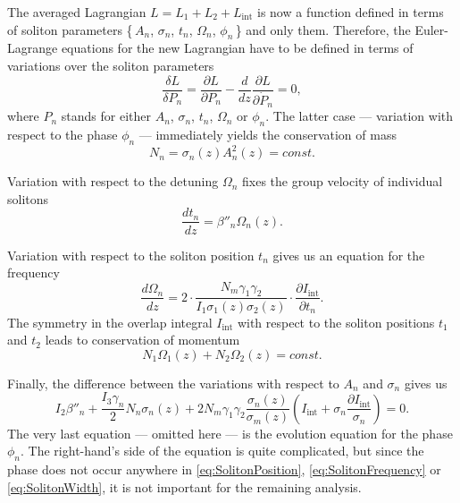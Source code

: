 \documentclass[a4paper,11pt]{article}
\begin{document}
The averaged Lagrangian $L = L_{1} + L_{2} + L_{\text{int}}$ is now a function defined in terms of soliton parameters \{\,$A_{n}$, $\sigma_{n}$, $t_{n}$, $\Omega_{n}$, $\phi_{n}$\,\} and only them. Therefore, the Euler-Lagrange equations for the new Lagrangian have to be defined in terms of variations over the soliton parameters
\begin{equation*}
  \frac{\delta L}{\delta P_{n}} =
    \frac{\partial{L}}{{\partial P_{n}}} -
    \frac{d}{dz} \frac{\partial L}{\partial \dot P_{n}} = 0,
\end{equation*}
where $P_{n}$ stands for either $A_{n}$, $\sigma_{n}$, $t_{n}$, $\Omega_{n}$ or $\phi_{n}$. The latter case --- variation with respect to the phase $\phi_{n}$ --- immediately yields the conservation of mass
\begin{equation}
  \label{eq:ConservationOfMass}
  N_{n} = \sigma_{n}(z) A_{n}^{2}(z) = const.
\end{equation}

Variation with respect to the detuning $\Omega_{n}$ fixes the group velocity of individual solitons
\begin{equation}
  \label{eq:SolitonPosition}
  \frac{d t_{n}}{dz} = \beta''_{n} \Omega_{n}(z).
\end{equation}

Variation with respect to the soliton position $t_{n}$ gives us an equation for the frequency
\begin{equation}
  \label{eq:SolitonFrequency}
  \frac{d \Omega_{n}}{dz} =
    2 \cdot \frac{N_{m} \gamma_{1} \gamma_{2}}
           {I_{1} \sigma_{1}(z) \sigma_{2}(z)} \cdot
    \frac{\partial I_{\text{int}}}{\partial t_{n}}.
\end{equation}
The symmetry in the overlap integral $I_{\text{int}}$ with respect to the soliton positions $t_{1}$ and $t_{2}$ leads to conservation of momentum
\begin{equation}
  \label{eq:ConservationOfMomentum}
  N_{1} \Omega_{1}(z) + N_{2} \Omega_{2}(z) = const.
\end{equation}

Finally, the difference between the variations with respect to $A_{n}$ and $\sigma_{n}$ gives us
\begin{equation}
  \label{eq:SolitonWidth}
  I_{2} \beta''_{n} +
  \frac{I_{3} \gamma_{n}}{2} N_{n} \sigma_{n}(z)
  + 2 N_{m} \gamma_{1} \gamma_{2} \frac{\sigma_{n}(z)}{\sigma_{m}(z)} \left(
    I_{\text{int}} + \sigma_{n} \frac{\partial I_{\text{int}}}{\sigma_{n}}
  \right) = 0.
\end{equation}
The very last equation --- omitted here --- is the evolution equation for the phase $\phi_{n}$. The right-hand's side of the equation is quite complicated, but since the phase does not occur anywhere in \eqref{eq:SolitonPosition}, \eqref{eq:SolitonFrequency} or \eqref{eq:SolitonWidth}, it is not important for the remaining analysis.
\end{document}
